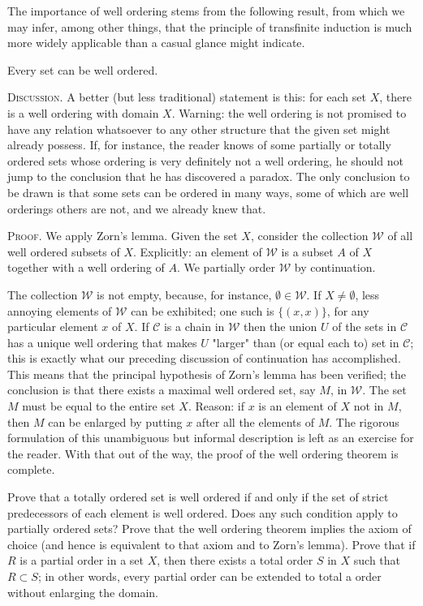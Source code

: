 The importance of well ordering stems from the following result, from which we may infer, among other things, that the principle of transfinite induction is much more widely applicable than a casual glance might indicate. 

\begin{named} Every set can be well ordered. 
\end{named}

\textsc{Discussion}. A better (but less traditional) statement is this: for each set $X$, there is a well ordering with domain $X$. Warning: the well ordering is not promised to have any relation whatsoever to any other structure that the given set might already possess. If, for instance, the reader knows of some partially or totally ordered sets whose ordering is very definitely not a well ordering, he should not jump to the conclusion that he has discovered a paradox. The only conclusion to be drawn is that some sets can be ordered in many ways, some of which are well orderings others are not, and we already knew that. 

\textsc{Proof}. We apply Zorn's lemma. Given the set $X$, consider the collection $\mathcal{W}$ of all well ordered subsets of $X$. Explicitly: an element of $\mathcal{W}$ is a subset $A$ of $X$ together with a well ordering of $A$. We partially order $\mathcal{W}$ by continuation. 

The collection $\mathcal{W}$ is not empty, because, for instance, $\emptyset \in \mathcal{W}$. If $X \neq \emptyset$, less annoying elements of $\mathcal{W}$ can be exhibited; one such is $\{ (x,x) \}$, for any particular element $x$ of $X$. If $\mathcal{C}$ is a chain in $\mathcal{W}$ then the union $U$ of the sets in $\mathcal{C}$ has a unique well ordering that makes $U$ "larger" than (or equal each to) set in $\mathcal{C}$; this is exactly what our preceding discussion of continuation has accomplished. This means that the principal hypothesis of Zorn's lemma has been verified; the conclusion is that there exists a maximal well ordered set, say $M$, in $\mathcal{W}$. The set $M$ must be equal to the entire set $X$. Reason: if $x$ is an element of $X$ not in $M$, then $M$ can be enlarged by putting $x$ after all the elements of $M$. The rigorous formulation of this unambiguous but informal description is left as an exercise for the reader. With that out of the way, the proof of the well ordering theorem is complete. 

\begin{exercise}[Exercise. ] Prove that a totally ordered set is well ordered if and only if the set of strict predecessors of each element is well ordered. Does any such condition apply to partially ordered sets? Prove that the well ordering theorem implies the axiom of choice (and hence is equivalent to that axiom and to Zorn's lemma). Prove that if $R$ is a partial order in a set $X$, then there exists a total order $S$ in $X$ such that $R \subset S$; in other words, every partial order can be extended to total a order without enlarging the domain.
\end{exercise}

